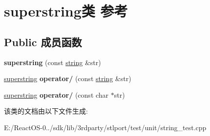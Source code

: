\hypertarget{classsuperstring}{}\section{superstring类 参考}
\label{classsuperstring}
\subsection*{Public 成员函数}
\begin{DoxyCompactItemize}
\item 
\mbox{\label{classsuperstring_ad92ff59ef09fea55e0187ab25e2e3eee}} 
{\bfseries superstring} (const \hyperlink{structstring}{string} \&str)
\item 
\mbox{\label{classsuperstring_a1545ca6f128232e687c02d97c5d941ff}} 
\hyperlink{classsuperstring}{superstring} {\bfseries operator/} (const \hyperlink{structstring}{string} \&str)
\item 
\mbox{\label{classsuperstring_a5f7f4f5079a12f962adec10c83769c6e}} 
\hyperlink{classsuperstring}{superstring} {\bfseries operator/} (const char $\ast$str)
\end{DoxyCompactItemize}


该类的文档由以下文件生成\+:\begin{DoxyCompactItemize}
\item 
E\+:/\+React\+O\+S-\/0../sdk/lib/3rdparty/stlport/test/unit/string\+\_\+test.\+cpp\end{DoxyCompactItemize}
